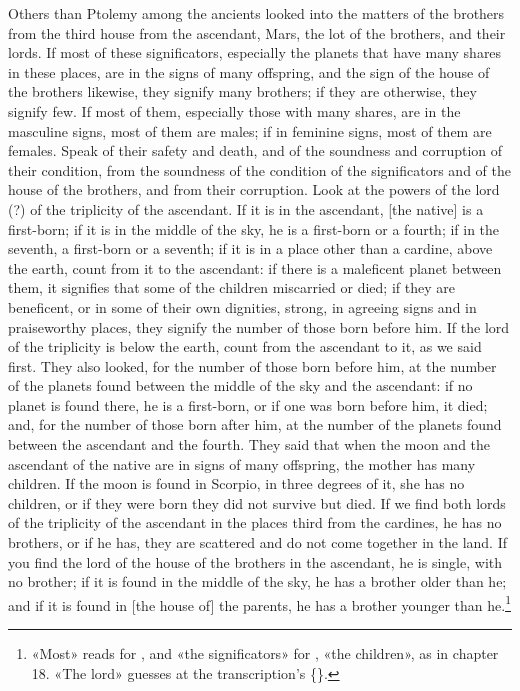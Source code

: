 \documentclass[11pt]{article}
\newcommand{\Fol}[1]{\marginpar{\footnotesize\color{gray}f.\,#1}}
\begin{document}
\par \Fol{40v}Others than Ptolemy among the ancients looked into the matters of the brothers from the third house from the ascendant, Mars, the lot of the brothers, and their lords. If most of these significators, especially the planets that have many shares in these places, are in the signs of many offspring, and the sign of the house of the brothers likewise, they signify many brothers; if they are otherwise, they signify few. If most of them, especially those with many shares, are in the masculine signs, most of them are males; if in feminine signs, most of them are females. Speak of their safety and death, and of the soundness and corruption of their condition, from the soundness of the condition of the significators and of the house of the brothers, and from their corruption. Look at the powers of the lord (?) of the triplicity of the ascendant. If it is in the ascendant, [the native] is a first-born; if it is in the middle of the sky, he is a first-born or a fourth; if in the seventh, a first-born or a seventh; if it is in a place other than a cardine, above the earth, count from it to the ascendant: if there is a maleficent planet between them, it signifies that some of the children miscarried or died; if they are beneficent, or in some of their own dignities, strong, in agreeing signs and in praiseworthy places, they signify the number of those born before him. If the lord of the triplicity is below the earth, count from the ascendant to it, as we said first. They also looked, for the number of those born before him, at the number of the planets found between the middle of the sky and the ascendant: if no planet is found there, he is a first-born, or if one was born before him, it died; and, for the number of those born after him, at the number of the planets found between the ascendant and the fourth. They said that when the moon and the ascendant of the native are in signs of many offspring, the mother has many children. If the moon is found in Scorpio, in three degrees of it, she has no children, or if they were born they did not survive but died. If we find both lords of the triplicity of the ascendant in the places third from the cardines, he has no brothers, or if he has, they are scattered and do not come together in the land. If you find the lord of the house of the brothers in the ascendant, he is single, with no brother; if it is found in the middle of the sky, he has a brother older than he; and if it is found in [the house of] the parents, he has a brother younger than he.\footnote{«Most» reads  for , and «the significators»  for , «the children», as in chapter 18. «The lord» guesses at the transcription's \{\}.}\par
\end{document}

